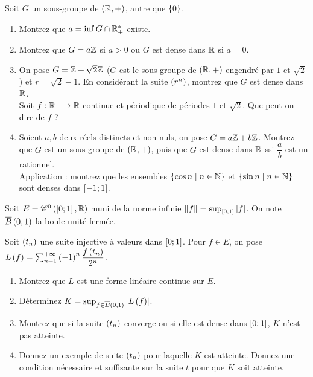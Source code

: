 \begin{exosss}[Exercice 31]
Soit \(G\) un sous-groupe de \(\groupe{\R}\), autre que \(\left\lbrace0\right\rbrace\).

\begin{enumerate}
    \item Montrez que \(a=\inf G\cap\mathbb{R}_+^*\) existe. \\
    \item Montrez que \(G=a\mathbb{Z}\) si \(a>0\) ou \(G\) est dense dans \(\mathbb{R}\) si \(a=0\). \\
    \item On pose \(G=\mathbb{Z}+\sqrt{2}\mathbb{Z}\) (\(G\) est le sous-groupe de \(\groupe{\R}\) engendré par \(1\) et \(\sqrt{2}\)) et \(r=\sqrt{2}-1\). En considérant la suite \(\left(r^n\right)\), montrez que \(G\) est dense dans \(\mathbb{R}\). \\ Soit \(f:\mathbb{R}\longrightarrow\mathbb{R}\) continue et périodique de périodes \(1\) et \(\sqrt{2}\). Que peut-on dire de \(f\) ? \\
    \item Soient \(a,b\) deux réels distincts et non-nuls, on pose \(G=a\mathbb{Z}+b\mathbb{Z}\). Montrez que \(G\) est un sous-groupe de \(\groupe{\R}\), puis que \(G\) est dense dans \(\mathbb{R}\) ssi \(\dfrac{a}{b}\) est un rationnel. \\ Application : montrez que les ensembles \(\left\lbrace\cos n\;\middle|\; n\in\mathbb{N}\right\rbrace\) et \(\left\lbrace\sin n\;\middle|\; n\in\mathbb{N}\right\rbrace\) sont denses dans \(\left[-1;1\right]\).
\end{enumerate}
\end{exosss}

\begin{corr}
\end{corr}

\begin{exosss}[Exercice 32]
Soit \(E=\mathscr{C}^{0}\left(\left[0;1\right],\mathbb{R}\right)\) muni de la norme infinie \(\left\|f\right\|=\sup_{\left[0;1\right]}\left\lvert f\right\rvert\). On note \(\overline{B}\left(0,1\right)\) la boule-unité fermée.

Soit \(\left(t_n\right)\) une suite injective à valeurs dans \(\left[0;1\right]\). Pour \(f\in E\), on pose \(L\left(f\right)=\sum_{n=1}^{+\infty}\left(-1\right)^n\dfrac{f\left(t_n\right)}{2^n}\).

\begin{enumerate}
    \item Montrez que \(L\) est une forme linéaire continue sur \(E\). \\
    \item Déterminez \(K=\sup_{f\in\overline{B}\left(0,1\right)}\left\lvert L\left(f\right)\right\rvert\). \\
    \item Montrez que si la suite \(\left(t_n\right)\) converge ou si elle est dense dans \(\left[0;1\right]\), \(K\) n'est pas atteinte. \\
    \item Donnez un exemple de suite \(\left(t_n\right)\) pour laquelle \(K\) est atteinte. Donnez une condition nécessaire et suffisante sur la suite \(t\) pour que \(K\) soit atteinte.
\end{enumerate}
\end{exosss}


